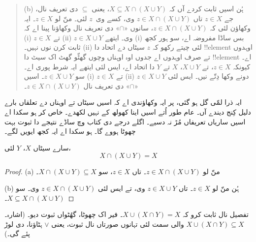 \documentclass[../../../include/open-logic-section]{subfiles}
\begin{document}
\begin{explain}
\begin{quote}
(b) ہُن اسیں ثابت کردے آں کہ $X \subseteq X \cap (X \cup Y)$، یعنی $\subseteq$ دی تعریف نال، جے $z \in X$ تاں $z \in X \cap
(X \cup Y)$ وی، کسے وی~$z$ لئی۔ منّ لو $z \in X$۔ ایہ وکھاؤن لئی کہ $z \in X
\cap (X \cup Y)$، سانوں «$\cap$» دی تعریف نال وکھاؤنا پینا اے کہ (i) $z \in X$ تے (ii) $z \in X \cup Y$ وی۔ ایتھے (i) بس ساڈا مفروضہ اے، سو ہور کجھ ثابت کرن نوں نہیں۔ (ii) لئی چیتے رکھو کہ $z$ سیٹاں دے اتحاد دا !!{element} اوہدوں تے صرف اوہدوں اے جدوں اوہ اوہناں وچوں گھٹّو گھٹ اک سیٹ دا !!{element} اے۔ کیونکہ $z \in X$، تے $X \cup Y$، $X$ تے $Y$ دا اتحاد اے، ایس لئی ایتھے ایہ شرط پوری اے۔ سو $z \in X \cup Y$۔ اسیں (i) $z \in X$ تے (ii) $z \in X \cup Y$ دونے وکھا دِتّے نیں۔ ایس لئی «$\cap$» دی تعریف نال $z \in X \cap (X \cup Y)$۔
\end{quote}

ایہ ذرا لمّی گل ہو گئی، پر ایہ وکھاؤندی اے کہ اسیں سیٹاں تے اوہناں دے تعلقاں بارے دلیل کِنج دیندے آں۔ عام طور اُتے اسیں اینا کھولھ کے نہیں لکھدے۔ خاص کر ہو سکدا اے اسیں ساریاں تعریفاں مُڑ نہ دسیے۔ اگلے درجے دی کتاب وچ ساڈے نتیجے دا ثبوت بہت چھوٹا ہووے گا۔ ہو سکدا اے ایہ کجھ ایویں لگے۔
\end{explain}

\begin{prop}[جذب]
سارے سیٹاں $X$، $Y$ لئی،
\[
X \cap (X \cup Y) = X
\]
\end{prop}

\begin{proof}
(a) منّ لو $z \in X \cap (X \cup Y)$۔ تاں $z \in X$، سو $X \cap (X
  \cup Y) \subseteq X$۔

(b) ہُن منّ لو $z \in X$۔ تاں $z \in X \cup Y$ وی، تے ایس لئی $z \in X \cap (X \cup Y)$ وی۔ سو $X \subseteq X \cap (X \cup
  Y)$۔
\end{proof}

\begin{prob}
تفصیل نال ثابت کرو کہ $X \cup (X \cap Y) = X$۔ فیر اک چھوٹا، گھُٹواں ثبوت دیو۔ (اشارہ۔ $X \cup (X \cap Y) \subseteq X$ والی سمت لئی تہانوں صورتاں نال ثبوت، یعنی $\lor$ ہٹاؤنا، دی لوڑ پئے گی۔)
\end{prob}
\end{document}
